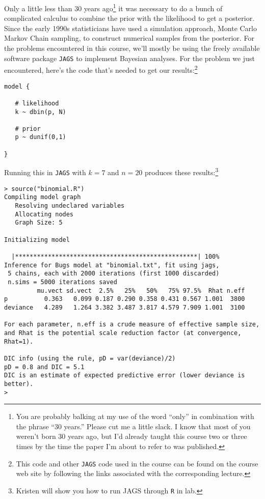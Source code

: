 Only a little less than 30 years ago\footnote{You are probably balking
  at my use of the word ``only'' in combination with the phrase ``30
  years.'' Please cut me a little slack. I know that most of you
  weren't born 30 years ago, but I'd already taught this course two or
  three times by the time the paper I'm about to refer to was
  published.} it was
necessary to do a bunch of complicated calculus to combine the prior
with the likelihood to get a posterior. Since the early 1990s
statisticians have used a simulation approach, Monte Carlo Markov
Chain sampling, to construct numerical samples from the posterior. For
the problems encountered in this course, we'll mostly be using the
freely available software package {\tt JAGS} to implement Bayesian
analyses. For the problem we just encountered, here's the code that's
needed to get our results:\footnote{This code and other {\tt JAGS}
  code used in the course can be found on the course web site by
  following the links associated with the corresponding
  lecture.}
\begin{verbatim}
model {

   # likelihood
   k ~ dbin(p, N)

   # prior
   p ~ dunif(0,1)

}
\end{verbatim}
Running this in {\tt JAGS} with $k=7$ and $n=20$ produces these
results:\footnote{Kristen will show you how to run JAGS through {\tt R}
  in lab.}
\begin{verbatim}
> source("binomial.R")
Compiling model graph
   Resolving undeclared variables
   Allocating nodes
   Graph Size: 5

Initializing model

  |**************************************************| 100%
Inference for Bugs model at "binomial.txt", fit using jags,
 5 chains, each with 2000 iterations (first 1000 discarded)
 n.sims = 5000 iterations saved
         mu.vect sd.vect  2.5%   25%   50%   75% 97.5%  Rhat n.eff
p          0.363   0.099 0.187 0.290 0.358 0.431 0.567 1.001  3800
deviance   4.289   1.264 3.382 3.487 3.817 4.579 7.909 1.001  3100

For each parameter, n.eff is a crude measure of effective sample size,
and Rhat is the potential scale reduction factor (at convergence, Rhat=1).

DIC info (using the rule, pD = var(deviance)/2)
pD = 0.8 and DIC = 5.1
DIC is an estimate of expected predictive error (lower deviance is better).
>
\end{verbatim}


